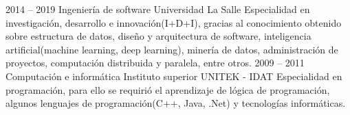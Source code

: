 
\begin{entrylist}
	\entry
		{2014 -- 2019}
		{Ingeniería de software}
		{Universidad La Salle}
		{Especialidad en investigación, desarrollo e innovación(I+D+I), gracias al conocimiento obtenido sobre estructura de datos, diseño y arquitectura de software, inteligencia artificial(machine learning, deep learning), minería de datos, administración de proyectos, computación distribuida y paralela, entre otros.}
	\entry
		{2009 -- 2011}
		{Computación e informática}
		{Instituto superior UNITEK - IDAT}
		{Especialidad en programación, para ello se requirió el aprendizaje de lógica de programación, algunos lenguajes de programación(C++, Java, .Net) y tecnologías informáticas.}
\end{entrylist}

